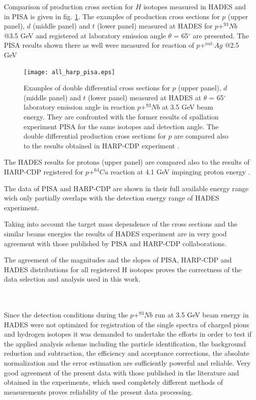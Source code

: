 Comparison of production cross section for $H$ isotopes measured in HADES and in PISA is given  
in fig. \ref{Comp_PISA_HARP_pdt}.  
The examples of production cross sections for 
$p$ (upper panel), $d$ (middle panel) and $t$ (lower panel) measured at HADES 
for $p+^{93}Nb$ @3.5 GeV and registered at laboratory emission angle $\theta$ = 65$^{\circ}$ are presented. The PISA results shown there as well were measured for reaction of $p+^{nat.}Ag$ @2.5 GeV  \cite{fidelus2017non} 

\begin{figure}[!h]
\centering
	\texttt{[image: all\_harp\_pisa.eps]}
	\caption{\label{Comp_PISA_HARP_pdt} 
		Examples of double differential cross sections for $p$ (upper panel), $d$ (middle panel) and $t$ 
		(lower panel) measured at HADES 
		at $\theta$ = 65$^{\circ}$ laboratory emission angle in reaction $p+^{93}Nb$ at 
		3.5 GeV beam energy.  They are confronted with the former results of spallation  
		experiment PISA \cite{fidelus2017non} for the same isotopes and detection angle. The double differential production 
		cross sections for $p$ are compared also to the results obtained in HARP-CDP experiment \cite{HARP_CDP_Cu_2009}. 
	}
\end{figure}

The HADES results for protons (upper panel) are compared also to 
the results of HARP-CDP 
registered for $p+^{64}Cu$ reaction at 4.1 GeV impinging proton energy \cite{HARP_CDP_Cu_2009}. 

The data of PISA and HARP-CDP are shown in their full available energy range wich only partially overlaps with the detection energy range of HADES experiment.

Taking into account the target mass dependence of the 
cross sections and the similar beams energies the results of HADES 
experiment are in very good agreement with those published by PISA and HARP-CDP collaborations.

The agreement of the magnitudes and the slopes of PISA, HARP-CDP and HADES distributions 
for all registered H isotopes proves the correctness of the 
data selection and analysis used in this work. 

 \ \\
 \ \\

Since the detection conditions during the $p+^{93}Nb$ run at 3.5 GeV beam energy in HADES were 
not optimized for registration of the single spectra of charged pions and hydrogen isotopes it was demanded to undertake the 
efforts in order to test if the applied analysis scheme 
including the particle identification, the background reduction and subtraction, 
the efficiency and acceptance corrections, the absolute normalization and the error 
estimation are sufficiently powerful and reliable. 
Very good agreement of the present data with those published in the literature and obtained in the experiments, 
which used completely different methods of measurements 
proves reliability of the present data processing.


